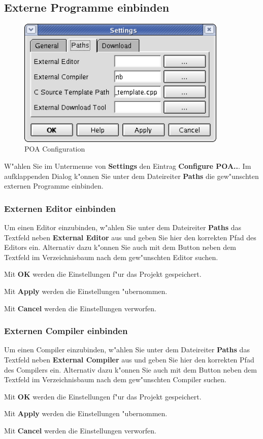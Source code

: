 \documentclass[a4paper,titlepage,12pt,ngerman]{scrbook}
\begin{document}
\subsection{Externe Programme einbinden}
\begin{figure}[htbp]

\begin{center}

\includegraphics[width=10cm]{POAConfiguration2}

\caption{POA Configuration}\label{test}

\end{center}

\end{figure}
W"ahlen Sie im Untermenue von {\bf Settings} den Eintrag {\bf Configure POA..}. Im aufklappenden Dialog k"onnen Sie unter dem Dateireiter {\bf Paths} die gew"unschten externen Programme einbinden.
\subsubsection{Externen Editor einbinden}
Um einen Editor einzubinden, w"ahlen Sie unter dem Dateireiter {\bf Paths} das Textfeld neben {\bf External Editor} aus und geben Sie hier den korrekten Pfad des Editors ein. Alternativ dazu k"onnen Sie auch mit dem Button neben dem Textfeld im Verzeichnisbaum nach dem gew"unschten Editor suchen.\par
Mit {\bf OK} werden die Einstellungen f"ur das Projekt gespeichert.\par
Mit {\bf Apply} werden die Einstellungen "ubernommen.\par
Mit {\bf Cancel} werden die Einstellungen verworfen.\par 

\subsubsection{Externen Compiler einbinden}
Um einen Compiler einzubinden, w"ahlen Sie unter dem Dateireiter {\bf Paths} das Textfeld neben {\bf External Compiler} aus und geben Sie hier den korrekten Pfad des Compilers ein. Alternativ dazu k"onnen Sie auch mit dem Button neben dem Textfeld im Verzeichnisbaum nach dem gew"unschten Compiler suchen.\par
Mit {\bf OK} werden die Einstellungen f"ur das Projekt gespeichert.\par
Mit {\bf Apply} werden die Einstellungen "ubernommen.\par
Mit {\bf Cancel} werden die Einstellungen verworfen.\par 
\end{document}

